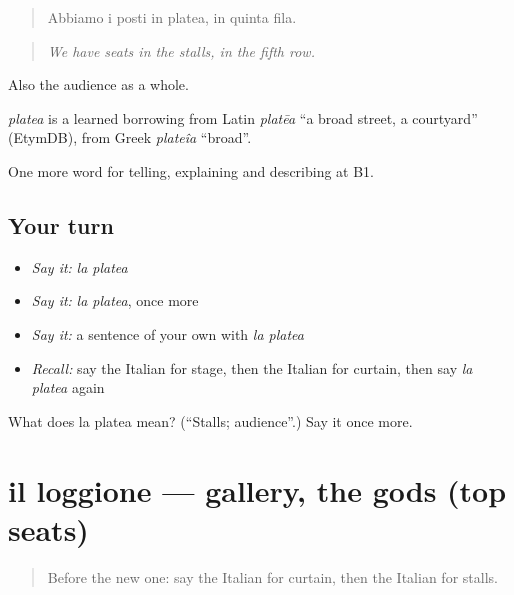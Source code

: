 \begin{quote}
Abbiamo i posti in platea, in quinta fila.
\end{quote}

\begin{quote}
\emph{We have seats in the stalls, in the fifth row.}
\end{quote}

Also the audience as a whole.

\begin{cousinweb}
\emph{platea} is a learned borrowing from Latin \emph{platēa} \textquotedblleft{}a broad street, a courtyard\textquotedblright{} (EtymDB), from Greek \emph{plateîa} \textquotedblleft{}broad\textquotedblright{}.
\end{cousinweb}

\begin{grammarlens}[title={What you've built}]
One more word for telling, explaining and describing at B1.
\end{grammarlens}

\subsection*{Your turn}
\begin{itemize}
\raggedright
  \item \emph{Say it:} \emph{la platea}
  \item \emph{Say it:} \emph{la platea}, once more
  \item \emph{Say it:} a sentence of your own with \emph{la platea}
  \item \emph{Recall:} say the Italian for stage, then the Italian for curtain, then say \emph{la platea} again
\end{itemize}

\begin{tcolorbox}[breakable,colback=teal!4,colframe=teal!35!black,title={Before you move on}]
What does la platea mean? (\textquotedblleft{}Stalls; audience\textquotedblright{}.) Say it once more.
\end{tcolorbox}
\section[il loggione]{il loggione — gallery, the gods (top seats)}

\label{lesson:IT-C519-loggione}



\begin{quote}
Before the new one: say the Italian for curtain, then the Italian for stalls.
\end{quote}

